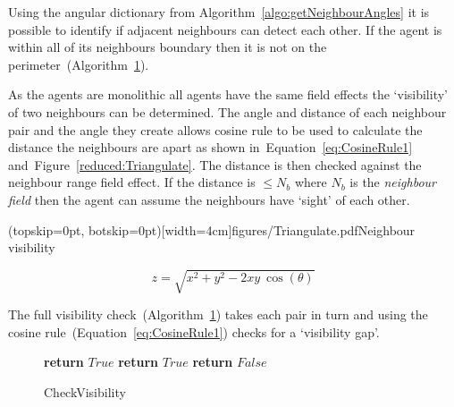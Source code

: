 \documentclass{ieeeaccess}
\begin{document}
Using the angular dictionary from Algorithm~\ref{algo:getNeighbourAngles} it is possible to identify if adjacent neighbours can detect each other. If the agent is within all of its neighbours boundary then it is not on the perimeter~(Algorithm~\ref{algo:checkVisibility}). 

As the agents are monolithic all agents have the same field effects the `visibility' of two neighbours can be determined. The angle and distance of each neighbour pair and the angle they create allows cosine rule to be used to calculate the distance the neighbours are apart as shown in~Equation~\ref{eq:CosineRule1} and~Figure~\ref{reduced:Triangulate}. The distance is then checked against the neighbour range field effect. If the distance is $\leq N_b$ where $N_b$ is the \textit{neighbour field} then the agent can assume the neighbours have `sight' of each other. 


\Figure[t!](topskip=0pt, botskip=0pt)[width=4cm]{figures/Triangulate.pdf}{Neighbour visibility\label{reduced:Triangulate}}

\begin{equation}\label{eq:CosineRule1}
z = \sqrt{x^2 + y^2 - 2xy~\cos(\theta)}
\end{equation}

The full visibility check~(Algorithm~\ref{algo:checkVisibility}) takes each pair in turn and using the cosine rule~(Equation~\ref{eq:CosineRule1}) checks for a `visibility gap'. 

\begin{figure}
\begin{algorithmic}[1]
			\State \textbf{return} $True$ 
   	\EndIf
		\State \textbf{return} $True$ 
	\EndIf
\EndFor
\State \textbf{return} $False$ 
\EndProcedure
\end{algorithmic}
\caption{CheckVisibility}
\label{algo:checkVisibility}
\end{figure}

\end{document}
